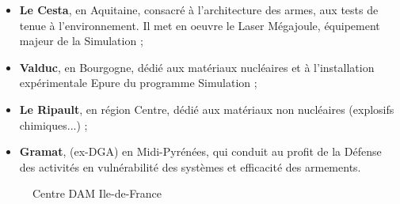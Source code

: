 \documentclass[12pt,a4paper,twoside]{article}
\begin{document}
\begin{itemize}[label=\textbullet]
	\item
		{\bf Le Cesta}, en Aquitaine, consacré à l'architecture des armes, aux
		tests de tenue à l'environnement. Il met en oeuvre le Laser Mégajoule,
		équipement majeur de la Simulation ;
	\item
		{\bf Valduc}, en Bourgogne, dédié aux matériaux nucléaires et à
		l'installation expérimentale Epure du programme Simulation ;
	\item
		{\bf Le Ripault}, en région Centre, dédié aux matériaux non nucléaires
		(explosifs chimiques...) ;
	\item
		{\bf Gramat}, (ex-DGA) en Midi-Pyrénées, qui conduit au profit de la
		Défense des activités en vulnérabilité des systèmes et efficacité des
		armements.
\end{itemize}

\begin{figure}[b]
	\begin{center}
		\caption{Centre DAM Ile-de-France}
	\end{center}
\end{figure}

\newpage
\end{document}
